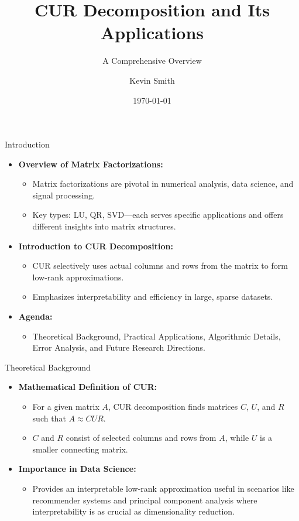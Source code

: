 \documentclass[pdf]{beamer}
\title{CUR Decomposition and Its Applications}
\subtitle{A Comprehensive Overview}
\author{Kevin Smith}
\date{\today}
\begin{document}
\begin{frame}
    \titlepage
\end{frame}

\begin{frame}{Introduction}
    \begin{itemize}
        \item \textbf{Overview of Matrix Factorizations:}
            \begin{itemize}
                \item Matrix factorizations are pivotal in numerical analysis, data science, and signal processing.
                \item Key types: LU, QR, SVD—each serves specific applications and offers different insights into matrix structures.
            \end{itemize}
        \item \textbf{Introduction to CUR Decomposition:}
            \begin{itemize}
                \item CUR selectively uses actual columns and rows from the matrix to form low-rank approximations.
                \item Emphasizes interpretability and efficiency in large, sparse datasets.
            \end{itemize}
        \item \textbf{Agenda:}
            \begin{itemize}
                \item Theoretical Background, Practical Applications, Algorithmic Details, Error Analysis, and Future Research Directions.
            \end{itemize}
    \end{itemize}
\end{frame}

\begin{frame}{Theoretical Background}
    \begin{itemize}
        \item \textbf{Mathematical Definition of CUR:}
            \begin{itemize}
                \item For a given matrix \( A \), CUR decomposition finds matrices \( C \), \( U \), and \( R \) such that \( A \approx CUR \).
                \item \( C \) and \( R \) consist of selected columns and rows from \( A \), while \( U \) is a smaller connecting matrix.
            \end{itemize}
        \item \textbf{Importance in Data Science:}
            \begin{itemize}
                \item Provides an interpretable low-rank approximation useful in scenarios like recommender systems and principal component analysis where interpretability is as crucial as dimensionality reduction.
            \end{itemize}
    \end{itemize}
\end{frame}
\end{document}
